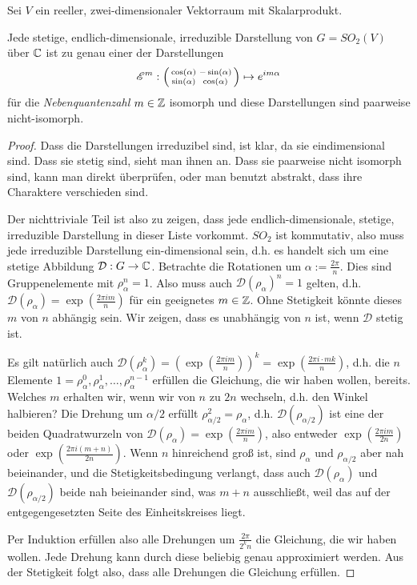 \begin{theoremdef}[Darstellungstheorie von $SO_2$ über $\IK=\IC$]
Sei $V$ ein reeller, zwei-dimensionaler Vektorraum mit Skalarprodukt.

Jede stetige, endlich-dimensionale, irreduzible Darstellung von $G=SO_2(V)$ über $\mathbb{C}$ ist zu genau einer der Darstellungen
\[\mathscr{E}^m : \begin{psmallmatrix}\cos(\alpha)&-\sin(\alpha)\\\sin(\alpha)&\cos(\alpha)\end{psmallmatrix} \mapsto e^{im\alpha}\]
für die \emph{Nebenquantenzahl} $m\in\mathbb{Z}$ isomorph und diese Darstellungen sind paarweise nicht-isomorph.
\end{theoremdef}
\begin{proof}
Dass die Darstellungen irreduzibel sind, ist klar, da sie eindimensional sind. Dass sie stetig sind, sieht man ihnen an. Dass sie paarweise nicht isomorph sind, kann man direkt überprüfen, oder man benutzt abstrakt, dass ihre Charaktere verschieden sind.

Der nichttriviale Teil ist also zu zeigen, dass jede endlich-dimensionale, stetige, irreduzible Darstellung in dieser Liste vorkommt. $SO_2$ ist kommutativ, also muss jede irreduzible Darstellung ein-dimensional sein, d.h. es handelt sich um eine stetige Abbildung $\mathcal{D}: G\to\mathbb{C}$. Betrachte die Rotationen um $\alpha:=\frac{2\pi}{n}$. Dies sind Gruppenelemente mit $\rho_\alpha^n=1$. Also muss auch $\mathcal{D}(\rho_\alpha)^n=1$ gelten, d.h. $\mathcal{D}(\rho_\alpha) = \exp(\frac{2\pi i m}{n})$ für ein geeignetes $m\in\mathbb{Z}$. Ohne Stetigkeit könnte dieses $m$ von $n$ abhängig sein. Wir zeigen, dass es unabhängig von $n$ ist, wenn $\mathcal{D}$ stetig ist.

Es gilt natürlich auch $\mathcal{D}(\rho_\alpha^k) = (\exp(\frac{2\pi i m}{n}))^k = \exp(\frac{2\pi i\cdot  mk}{n})$, d.h. die $n$ Elemente $1=\rho_\alpha^0, \rho_\alpha^1, \ldots, \rho_\alpha^{n-1}$ erfüllen die Gleichung, die wir haben wollen, bereits. Welches $m$ erhalten wir, wenn wir von $n$ zu $2n$ wechseln, d.h. den Winkel halbieren? Die Drehung um $\alpha/2$ erfüllt $\rho_{\alpha/2}^2=\rho_\alpha$, d.h. $\mathcal{D}(\rho_{\alpha/2})$ ist eine der beiden Quadratwurzeln von $\mathcal{D}(\rho_\alpha)=\exp(\frac{2\pi i m}{n})$, also entweder $\exp(\frac{2\pi i m}{2n})$ oder $\exp(\frac{2\pi i(m+n)}{2n})$. Wenn $n$ hinreichend groß ist, sind $\rho_\alpha$ und $\rho_{\alpha/2}$ aber nah beieinander, und die Stetigkeitsbedingung verlangt, dass auch $\mathcal{D}(\rho_\alpha)$ und $\mathcal{D}(\rho_{\alpha/2})$ beide nah beieinander sind, was $m+n$ ausschließt, weil das auf der entgegengesetzten Seite des Einheitskreises liegt.

Per Induktion erfüllen also alle Drehungen um $\frac{2\pi}{2^k n}$ die Gleichung, die wir haben wollen. Jede Drehung kann durch diese beliebig genau approximiert werden. Aus der Stetigkeit folgt also, dass alle Drehungen die Gleichung erfüllen.
\end{proof}

